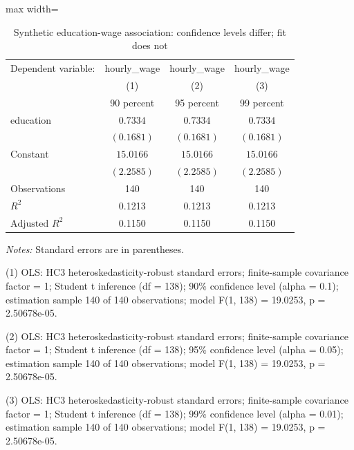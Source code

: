 \begin{table}[htbp]
\centering
\caption{Synthetic education-wage association: confidence levels differ; fit does not}
\begingroup
\small
\setlength{\tabcolsep}{6pt}
\renewcommand{\arraystretch}{1.12}
\begin{adjustbox}{max width=\linewidth}
\begin{tabular}{@{}lccc@{}}
\toprule
Dependent variable: & hourly\_wage & hourly\_wage & hourly\_wage \\
 & (1) & (2) & (3) \\
 & 90 percent & 95 percent & 99 percent \\
\midrule
education & $0.7334$ & $0.7334$ & $0.7334$ \\
 & $(0.1681)$ & $(0.1681)$ & $(0.1681)$ \\[0.35em]
Constant & $15.0166$ & $15.0166$ & $15.0166$ \\
 & $(2.2585)$ & $(2.2585)$ & $(2.2585)$ \\[0.35em]
\midrule
Observations & 140 & 140 & 140 \\
$R^{2}$ & 0.1213 & 0.1213 & 0.1213 \\
$\text{Adjusted }R^{2}$ & 0.1150 & 0.1150 & 0.1150 \\
\bottomrule
\end{tabular}
\end{adjustbox}
\par\smallskip
\begin{minipage}{\linewidth}
\footnotesize
\raggedright
\textit{Notes:} Standard errors are in parentheses.\par
(1) OLS: HC3 heteroskedasticity-robust standard errors; finite-sample covariance factor = 1; Student t inference (df = 138); 90\% confidence level (alpha = 0.1); estimation sample 140 of 140 observations; model F(1, 138) = 19.0253, p = 2.50678e-05.\par
(2) OLS: HC3 heteroskedasticity-robust standard errors; finite-sample covariance factor = 1; Student t inference (df = 138); 95\% confidence level (alpha = 0.05); estimation sample 140 of 140 observations; model F(1, 138) = 19.0253, p = 2.50678e-05.\par
(3) OLS: HC3 heteroskedasticity-robust standard errors; finite-sample covariance factor = 1; Student t inference (df = 138); 99\% confidence level (alpha = 0.01); estimation sample 140 of 140 observations; model F(1, 138) = 19.0253, p = 2.50678e-05.\par
\end{minipage}
\endgroup
\end{table}